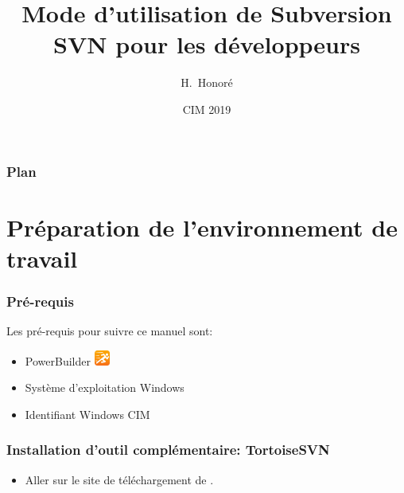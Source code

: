 \documentclass{beamer}
\title[Mode d'utlisation SVN] %
{Mode d'utilisation de Subversion SVN pour les développeurs}
\author[HOUEKPETODJI, Honoré] %
{ H.~Honoré}
\date [2019] %
{CIM 2019}
\begin{document}
\frame{\titlepage}


\begin{frame}
\frametitle{Plan}
\tableofcontents
\end{frame}


\section{Préparation de l'environnement de travail}

\begin{frame}[label={preparation}]
\frametitle{Pré-requis}
Les pré-requis pour suivre ce manuel sont:
\begin{itemize}
    \item PowerBuilder \includegraphics[height=0.5cm]{../images/pb.jpg}
    \item Système d'exploitation Windows
    \item Identifiant Windows CIM
\end{itemize}
\end{frame}

\begin{frame}
\frametitle{Installation d'outil complémentaire: TortoiseSVN }
\begin{itemize}
\item Aller sur le site de téléchargement de \href{https://tortoisesvn.net/downloads.html}{}. 
\end{itemize}
\end{frame}
\end{document}
